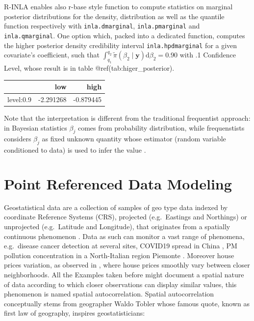 \documentclass[
  12pt,
  a4paper,
  oneside]{book}
\newcommand{\passthrough}[1]{#1}
\theoremstyle{definition}
\theoremstyle{definition}
\theoremstyle{definition}
\theoremstyle{remark}
\begin{document}
R-INLA enables also r-base style function to compute statistics on marginal posterior distributions for the density, distribution as well as the quantile function respectively with \passthrough{\lstinline!inla.dmarginal!}, \passthrough{\lstinline!inla.pmarginal!} and \passthrough{\lstinline!inla.qmarginal!}. One option which, packed into a dedicated function, computes the higher posterior density credibility interval \passthrough{\lstinline!inla.hpdmarginal!} for a given covariate's coefficient, such that \(\int_{q_{1}}^{q_{2}} \tilde{\pi}\left(\beta_{2} \mid \boldsymbol{y}\right) \mathrm{d} \beta_{2}=0.90\) with .1 Confidence Level, whose result is in table @ref(tab:higer\_posterior).

\begin{tabular}{lrr}
\toprule
  & low & high\\
\midrule
level:0.9 & -2.291268 & -0.879445\\
\bottomrule
\end{tabular}

Note that the interpretation is different from the traditional frequentist approach: in Bayesian statistics \(\beta_{j}\) comes from probability distribution, while frequenstists considers \(\beta_{j}\) as fixed unknown quantity whose estimator (random variable conditioned to data) is used to infer the value \citeyearpar{Blangiardo-Cameletti}.

\hypertarget{prdm}{%
\chapter{Point Referenced Data Modeling}\label{prdm}}

Geostatistical data are a collection of samples of geo type data indexed by coordinate Reference Systems (CRS), projected (e.g.~Eastings and Northings) or unprojected (e.g.~Latitude and Longitude), that originates from a spatially continuous phenomenon \citep{Moraga2019}. Data as such can monitor a vast range of phenomena, e.g.~disease cancer detection \citep{Bell2006} at several sites, COVID19 spread in China \citep{Li_Li_Ding_Hu_Chen_Wang_Peng_Shen_2020}, PM pollution concentration in a North-Italian region Piemonte \citep{Cameletti2012}. Moreover house prices variation, as observed in \citet{Bayesian_INLA_Rubio}, where house prices smoothly vary between closer neighborhoods. All the Examples taken before might document a spatial nature of data according to which closer observations can display similar values, this phenomenon is named spatial autocorrelation. Spatial autocorrelation conceptually stems from geographer Waldo Tobler whose famous quote, known as first law of geography, inspires geostatisticians:
\end{document}

